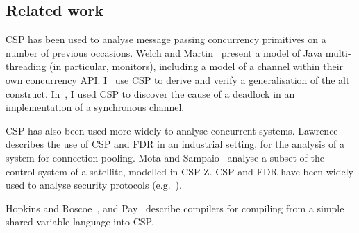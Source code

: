 
\subsection{Related work}

CSP has been used to analyse message passing concurrency primitives on a
number of previous occasions.
%
Welch and Martin~\cite{welch-martin} present a model of Java multi-threading
(in particular, monitors), including a model of a channel within their own
concurrency API\@.
%
I~\cite{gavin:alt} use CSP to derive and verify a generalisation of the
alt construct.  
%
In~\cite{gavin:OneOne}, I used CSP to discover the cause of a deadlock in an
implementation of a synchronous channel. 

CSP has also been used more widely to analyse concurrent systems. 
%
Lawrence~\cite{lawrence} describes the use of CSP and FDR in an
industrial setting, for the analysis of a system for connection pooling.
% 
Mota and Sampaio~\cite{mota+sampaio} analyse a subset of the
control system of a satellite, modelled in CSP-Z\@.  
%
CSP and FDR have been widely used to analyse security protocols
(e.g.~\cite{gavin:NSFDR}).

Hopkins and Roscoe~\cite{hopkins-roscoe}, and Pay~\cite{alex:project} describe
compilers for compiling from a simple shared-variable language into CSP\@.






